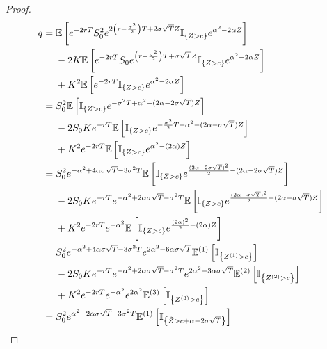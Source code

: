 \documentclass[12pt]{article}  %
\numberwithin{equation}{subsection}
\theoremstyle{plain}
\begin{document}
\begin{proof}  %

\begin{align}
q={}& \mathbb{E}\left[ e^{-2rT}S_0^2e^{2\left( r-\frac{\sigma^2}{2}\right) T+2\sigma\sqrt{T}Z}\mathbb{I}_{\left\lbrace Z>c\right\rbrace }e^{\alpha^2-2\alpha Z}\right] \notag\\
&-2K\mathbb{E}\left[ e^{-2rT}S_0e^{\left( r-\frac{\sigma^2}{2}\right) T+\sigma\sqrt{T}Z} \mathbb{I}_{\left\lbrace Z>c\right\rbrace }e^{\alpha^2-2\alpha Z}\right] \notag\\
&+K^2\mathbb{E}\left[ e^{-2rT}\mathbb{I}_{\left\lbrace Z>c\right\rbrace }e^{\alpha^2-2\alpha Z}\right] \notag\\
={}&S_0^2\mathbb{E}\left[ \mathbb{I}_{\left\lbrace Z>c\right\rbrace }e^{-\sigma^2 T+\alpha^2-(2\alpha-2\sigma\sqrt{T})Z}\right] \notag\\
&-2S_0Ke^{-rT}\mathbb{E}\left[ \mathbb{I}_{\left\lbrace Z>c\right\rbrace }e^{-\frac{\sigma^2}{2}T+\alpha^2-(2\alpha-\sigma\sqrt{T})Z}\right] \notag\\
&+K^2e^{-2rT}\mathbb{E}\left[ \mathbb{I}_{\left\lbrace Z>c\right\rbrace }e^{\alpha^2-(2\alpha) Z}\right] \notag\\
={}&S_0^2e^{-\alpha^2+4\alpha\sigma\sqrt{T}-3\sigma^2 T}\mathbb{E}\left[ \mathbb{I}_{\left\lbrace Z>c\right\rbrace }e^{\frac{(2\alpha-2\sigma\sqrt{T})^2}{2}-(2\alpha-2\sigma\sqrt{T})Z}\right] \notag\\
&-2S_0Ke^{-rT}e^{-\alpha^2+2\alpha\sigma\sqrt{T}-\sigma^2 T}\mathbb{E}\left[ \mathbb{I}_{\left\lbrace Z>c\right\rbrace }e^{\frac{(2\alpha-\sigma\sqrt{T})^2}{2}-(2\alpha-\sigma\sqrt{T})Z}\right] \notag\\
&+K^2e^{-2rT}e^{-\alpha^2}\mathbb{E}\left[ \mathbb{I}_{\left\lbrace Z>c\right\rbrace }e^{\frac{(2\alpha)^2}{2}-(2\alpha) Z}\right] \notag\\
={}&S_0^2e^{-\alpha^2+4\alpha\sigma\sqrt{T}-3\sigma^2 T}e^{2\alpha^2-6\alpha\sigma\sqrt{T}}\mathbb{E}^{(1)}\left[ \mathbb{I}_{\left\lbrace Z^{(1)}>c\right\rbrace }\right] \notag\\
&-2S_0Ke^{-rT}e^{-\alpha^2+2\alpha\sigma\sqrt{T}-\sigma^2 T}e^{2\alpha^2-3\alpha\sigma\sqrt{T}}\mathbb{E}^{(2)}\left[ \mathbb{I}_{\left\lbrace Z^{(2)}>c\right\rbrace }\right] \notag\\
&+K^2e^{-2rT}e^{-\alpha^2}e^{2\alpha^2}\mathbb{E}^{(3)}\left[ \mathbb{I}_{\left\lbrace Z^{(3)}>c\right\rbrace }\right] \notag\\
={}&S_0^2e^{\alpha^2-2\alpha\sigma\sqrt{T}-3\sigma^2 T}\mathbb{E}^{(1)}\left[ \mathbb{I}_{\left\lbrace \tilde{Z}>c+\alpha-2\sigma\sqrt{T}\right\rbrace }\right] \notag\\

\end{align}
\end{proof}
\end{document}
